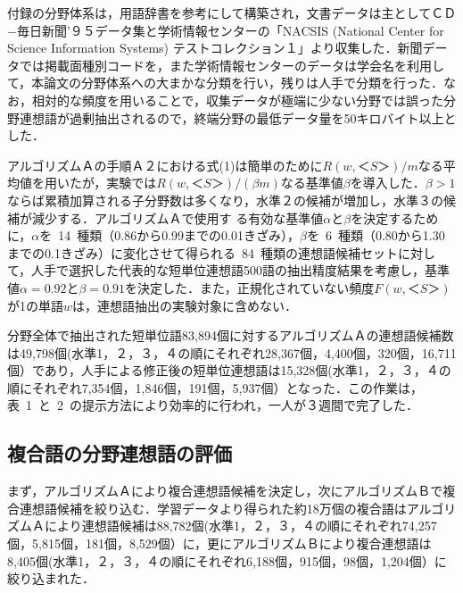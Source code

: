 付録の分野体系は，用語辞書\cite{戸澤1998,現代用語1997,知恵蔵1996}を参考にして構築され，文書データは主としてＣＤ−毎日新聞’９５データ集と学術情報センターの「NACSIS (National Center for Science Information Systems) テストコレクション１」より収集した．新聞データでは掲載面種別コードを，また学術情報センターのデータは学会名を利用して，本論文の分野体系への大まかな分類を行い，残りは人手で分類を行った．なお，相対的な頻度を用いることで，収集データが極端に少ない分野では誤った分野連想語が過剰抽出されるので，終端分野の最低データ量を50キロバイト以上とした．

アルゴリズムＡの手順Ａ２における式(1)は簡単のために$R(w, ＜S＞)/m$\mbox{なる平均値を用い}たが，実験では$R(w, ＜S＞)/(\beta m)$なる基準値$\beta$を導入した．$\beta > 1$ならば\mbox{累積加算される子分}野数は多くなり，水準２の候補が増加し，水準３の候補が減少する．アルゴリズムＡで使用す\break
る有効な基準値$\alpha$と$\beta$を決定するために，$\alpha$を~14~種類（0.86から0.99までの0.01\mbox{きざみ），$\beta$}を~6~種類（0.80から1.30までの0.1きざみ）に変化させて得られる~84~種類の連想語候補セットに対して，人手で選択した代表的な短単位連想語500語の抽出精度結果を考慮し，基準値$\alpha =0.92$と$\beta =0.91$を決定した．また，正規化されていない頻度$F(w,＜S＞)$が1の単語$w$は，連想語抽出の実験対象に含めない．

分野全体で抽出された短単位語83,894個に対するアルゴリズムＡの連想語候補数は49,798個(水準1，２，３，４の順にそれぞれ28,367個，4,400個，320個，16,711個）であり，人手による修正後の短単位連想語は15,328個(水準1，２，３，４の順にそれぞれ7,354個，1,846個，191個，5,937個）となった．この作業は，表~1~と~2~の提示方法により効率的に行われ，一人が３週間で完了した．

\subsection{複合語の分野連想語の評価}

まず，アルゴリズムＡにより複合連想語候補を決定し，次にアルゴリズムＢで複合連想語候補を絞り込む．学習データより得られた約18万個の複合語はアルゴリズムＡにより連想語候補は88,782個(水準1，２，３，４の順にそれぞれ74,257個，5,815個，181個，8,529個）に，更にアルゴリズムＢにより複合連想語は8,405個(水準1，２，３，４の順にそれぞれ6,188個，915個，98個，1,204個）に絞り込まれた．

